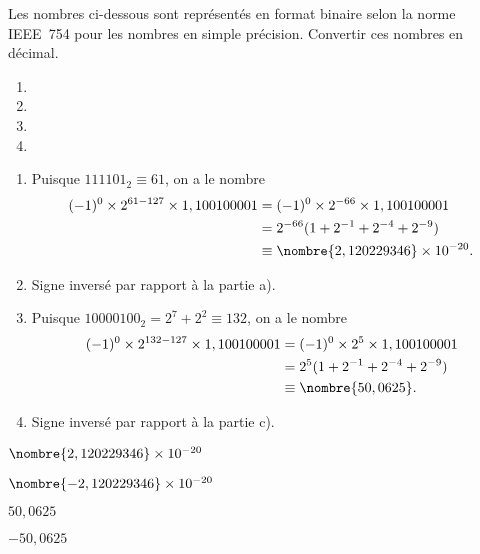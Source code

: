 \begin{exercice}
  \label{ex:ordinateurs:ieee}
  Les nombres ci-dessous sont représentés en format binaire selon la
  norme IEEE~754 pour les nombres en simple précision. Convertir ces
  nombres en décimal.
  \begin{enumerate}
  \item {}
  \item {}
  \item {}
  \item {}
  \end{enumerate}
  \begin{sol}
    \begin{enumerate}
    \item Puisque $111101_2 \equiv 61$, on a le nombre
      \begin{align*}
        (-1)^0 \times 2^{61 - 127} \times 1,100100001
        &= (-1)^0 \times 2^{-66} \times 1,100100001 \\
        &= 2^{-66} (1 + 2^{-1} + 2^{-4} + 2^{-9}) \\
        &\equiv \nombre{2,120229346} \times 10^{-20}.
      \end{align*}
    \item Signe inversé par rapport à la partie a).
    \item Puisque $10000100_2 = 2^7 + 2^2 \equiv 132$, on a le nombre
      \begin{align*}
        (-1)^0 \times 2^{132 - 127} \times 1,100100001
        &= (-1)^0 \times 2^5 \times 1,100100001 \\
        &= 2^5 (1 + 2^{-1} + 2^{-4} + 2^{-9}) \\
        &\equiv \nombre{50,0625}.
      \end{align*}
    \item Signe inversé par rapport à la partie c).
    \end{enumerate}
  \end{sol}
  \begin{rep}
    \sloppy
    \begin{inparaenum}
    \item $\nombre{2,120229346} \times 10^{-20}$
    \item $\nombre{-2,120229346} \times 10^{-20}$
    \item $50,0625$
    \item $-50,0625$
    \end{inparaenum}
  \end{rep}
\end{exercice}

